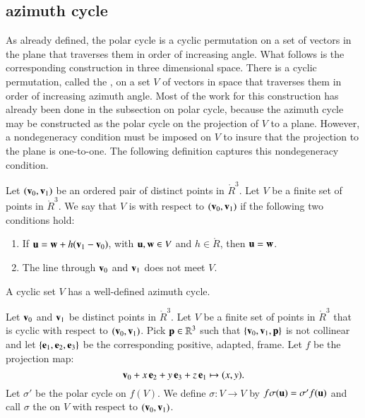 \subsection{azimuth cycle}

As already defined, the polar cycle is a cyclic permutation on a set
of vectors in the plane that traverses them in order of increasing
angle.  What follows is the corresponding construction in three
dimensional space.  There is a cyclic permutation, called the
, on a set $V$ of vectors in space that
traverses them in order of increasing azimuth angle.  Most of the work
for this construction has already been done in the subsection on polar
cycle, because the azimuth cycle may be constructed as the polar cycle
on the projection of $V$ to a plane.  However, a nondegeneracy
condition must be imposed on $V$ to insure that the projection to the
plane is one-to-one.  The following definition captures this
nondegeneracy condition.  %
%
%
%


\begin{definition}
Let $({\mathbf v}_0,{\mathbf v}_1)$ be an ordered pair of
  distinct points in $\ring{R}^3$.  Let $V$ be a finite set of points
  in $\ring{R}^3$.  We say that $V$ is  with respect to
  $({\mathbf v}_0,{\mathbf v}_1)$ if the following two conditions hold:
\begin{enumerate}
\item If ${\mathbf u} = {\mathbf w} + h ({\mathbf v}_1-{\mathbf v}_0)$, with ${\mathbf u},{\mathbf w}\in V$ and $h\in \ring{R}$,
then ${\mathbf u}={\mathbf w}$.  
\item  The line through ${\mathbf v}_0$ and ${\mathbf v}_1$ does not meet $V$.
\end{enumerate}
\end{definition}
%

A cyclic set $V$ has a well-defined azimuth cycle.

\begin{definition}
  Let ${\mathbf v}_0$ and ${\mathbf v}_1$ be distinct points in $\ring{R}^3$.  Let $V$
  be a finite set of points in $\ring{R}^3$ that is cyclic with
  respect to $({\mathbf v}_0,{\mathbf v}_1)$.  Pick ${\mathbf p}\in\mathbb{R}^3$ such that
  $\{{\mathbf v}_0,{\mathbf v}_1,{\mathbf p}\}$ is not collinear and let $\{{\mathbf e}_1,{\mathbf e}_2,{\mathbf e}_3\}$ be
  the corresponding positive, adapted, frame.  Let $f$ be the
  projection map:
\begin{displaymath}{\mathbf v}_0 + x\, {\mathbf e}_2 + y\, {\mathbf e}_3 + z\, {\mathbf e}_1 \mapsto
(x,y).\end{displaymath}
Let $\sigma'$ be the polar cycle on $f(V)$. We define
$\sigma:V\to V$ by $f\sigma({\mathbf u}) =\sigma'f({\mathbf u})$
and call $\sigma$ the 
on $V$ with respect to $({\mathbf v}_0,{\mathbf v}_1)$.
%
%
%
%
%
\end{definition}

